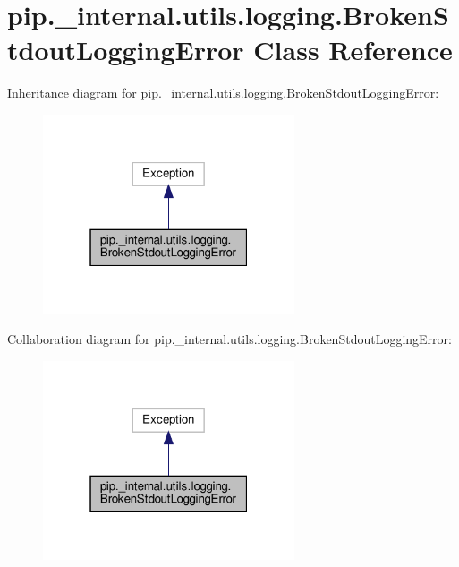 \hypertarget{classpip_1_1__internal_1_1utils_1_1logging_1_1BrokenStdoutLoggingError}{}\section{pip.\+\_\+internal.\+utils.\+logging.\+Broken\+Stdout\+Logging\+Error Class Reference}
\label{classpip_1_1__internal_1_1utils_1_1logging_1_1BrokenStdoutLoggingError}


Inheritance diagram for pip.\+\_\+internal.\+utils.\+logging.\+Broken\+Stdout\+Logging\+Error\+:
\nopagebreak
\begin{figure}[H]
\begin{center}
\leavevmode
\includegraphics[width=211pt]{classpip_1_1__internal_1_1utils_1_1logging_1_1BrokenStdoutLoggingError__inherit__graph}
\end{center}
\end{figure}


Collaboration diagram for pip.\+\_\+internal.\+utils.\+logging.\+Broken\+Stdout\+Logging\+Error\+:
\nopagebreak
\begin{figure}[H]
\begin{center}
\leavevmode
\includegraphics[width=211pt]{classpip_1_1__internal_1_1utils_1_1logging_1_1BrokenStdoutLoggingError__coll__graph}
\end{center}
\end{figure}


